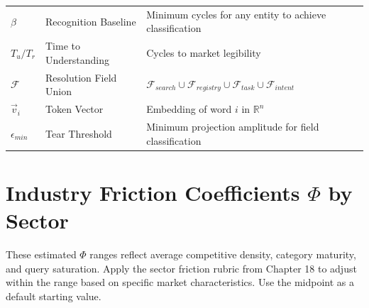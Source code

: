\documentclass[12pt, openany]{book}
\theoremstyle{thmstyle}
\theoremstyle{defstyle}
\begin{document}
\begin{longtable}{@{}p{1.0in} p{1.3in} p{3.5in}@{}}
$\beta$ & Recognition Baseline & Minimum cycles for any entity to achieve classification \\[3pt]
$T_u / T_r$ & Time to Understanding & Cycles to market legibility \\[3pt]
$\mathcal{F}$ & Resolution Field Union & $\mathcal{F}_{search} \cup \mathcal{F}_{registry} \cup \mathcal{F}_{task} \cup \mathcal{F}_{intent}$ \\[3pt]
$\vec{v}_i$ & Token Vector & Embedding of word $i$ in $\mathbb{R}^n$ \\[3pt]
$\epsilon_{min}$ & Tear Threshold & Minimum projection amplitude for field classification \\[3pt]
\end{longtable}

\chapter{Industry Friction Coefficients $\Phi$ by Sector}

\begin{appbox}
These estimated $\Phi$ ranges reflect average competitive density, category maturity, and query saturation. Apply the sector friction rubric from Chapter 18 to adjust within the range based on specific market characteristics. Use the midpoint as a default starting value.
\end{appbox}
\end{document}
